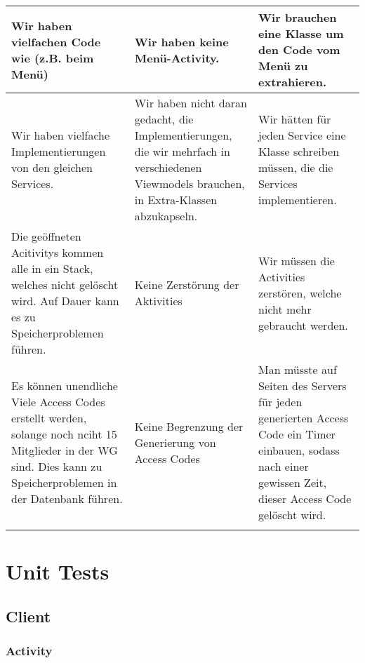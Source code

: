 \documentclass[a4paper]{scrreprt}
\begin{document}
\begin{flushleft}
\begin{longtable}{|p{}|p{}|p{}|}
\hline

{Wir haben vielfachen Code wie (z.B. beim Menü)} & {Wir haben keine Menü-Activity.} & {Wir brauchen eine Klasse um den Code vom Menü zu extrahieren.} \\

\hline

{Wir haben vielfache Implementierungen von den gleichen Services.} & {Wir haben nicht daran gedacht, die Implementierungen, die wir mehrfach in verschiedenen Viewmodels brauchen, in Extra-Klassen abzukapseln.} & {Wir hätten für jeden Service eine Klasse schreiben müssen, die die Services implementieren.} \\


\hline

{Die geöffneten Acitivitys kommen alle in ein Stack, welches nicht gelöscht wird. Auf Dauer kann es zu Speicherproblemen führen.} & {Keine Zerstörung der Aktivities } & {Wir müssen die Activities zerstören, welche nicht mehr gebraucht werden.} \\

\hline

{Es können unendliche Viele Access Codes erstellt werden, solange noch nciht 15 Mitglieder in der WG sind. Dies kann zu Speicherproblemen in der Datenbank führen.} & {Keine Begrenzung der Generierung von Access Codes} & {Man müsste auf Seiten des Servers für jeden generierten Access Code ein Timer einbauen, sodass nach einer gewissen Zeit, dieser Access Code gelöscht wird.} \\

\hline

{} & {} & {} \\

\hline

		\end{longtable}
	\end{flushleft}	
	
	\chapter{Unit Tests}
	\section{Client}
	\subsection{Activity}
\end{document}
